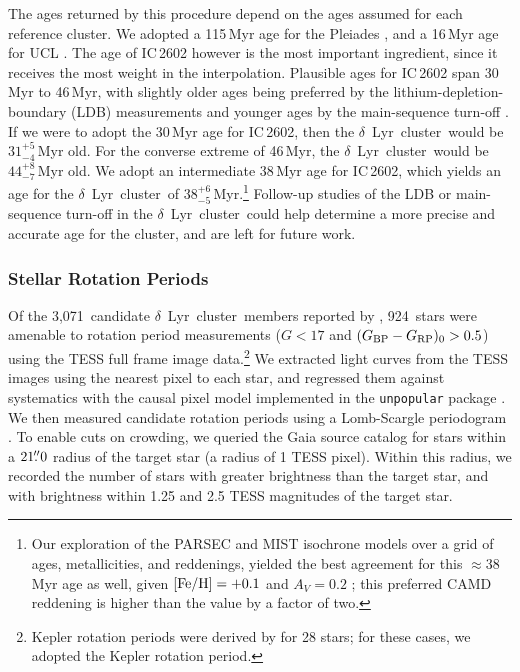 \documentclass[12pt,modern,twocolumn,tighten]{aastex63}
\newcommand{\cn}{$\delta$\ Lyr\ cluster} %
\newcommand{\clusterage}{$38^{+6}_{-5}$\,Myr} %
\newcommand{\noriginal}{3{,}071} %
\newcommand{\nwithtess}{924} %
\newcommand{\bpmrpo}{(G_{\rm BP}-G_{\rm RP})_0}
\begin{document}

The ages returned by this procedure depend on the ages assumed for
each reference cluster.  We adopted a 115\,Myr age for the Pleiades \citep{dahm_2015},
and a 16\,Myr age for UCL \citep{pecaut_star_2016}.  The age
of IC\,2602 however is the most important ingredient, since it
receives the most weight in the interpolation.  Plausible ages for
IC\,2602 span 30\,Myr to 46\,Myr, with slightly older ages being
preferred by the lithium-depletion-boundary (LDB) measurements 
\citep{dobbie_ic_2010,randich_gaiaeso_2018}
and
younger ages by the main-sequence turn-off
\citep{stauffer_rotational_1997,david_ages_2015,bossini_age_2019}.
If we were to adopt the 30\,Myr age for IC\,2602, then the \cn\ would
be $31^{+5}_{-4}$\,Myr old.  For the converse extreme of 46\,Myr, the
\cn\ would be $44^{+8}_{-7}$\,Myr old.  We adopt an intermediate
38\,Myr age for IC\,2602, which yields an age for the \cn\ of
\clusterage.\footnote{Our exploration of the PARSEC and MIST isochrone
models over a grid of ages, metallicities, and reddenings, yielded the
best agreement for this $\approx 38\,$Myr age as well, given ${\rm
[Fe/H] = +0.1}$ and $A_V=0.2$
\citep{bressan_parsec_2012,choi_mesa_2016};  this preferred CAMD
reddening is higher than the \citet{lallement_threedimensional_2018}
value by a factor of two.  } Follow-up studies of the LDB or
main-sequence turn-off in the \cn\ could help determine a more precise
and accurate age for the cluster, and are left for future work.





\subsubsection{Stellar Rotation Periods}

Of the \noriginal\ candidate \cn\ members reported by
\citet{kounkel_untangling_2019}, \nwithtess\ stars were amenable to
rotation period measurements ($G<17$ and $\bpmrpo>0.5$) using the TESS
full frame image data.\footnote{Kepler rotation periods were derived
by \citet{mcquillan_rotation_2014} for 28 stars; for these cases, we
adopted the Kepler rotation period.  } We extracted light curves from
the TESS images using the nearest pixel to each star, and regressed
them against systematics with the causal pixel model implemented in
the \texttt{unpopular} package \citep{hattorio_2021_cpm}.  We then
measured candidate rotation periods using a Lomb-Scargle periodogram
\citep{lomb_1976,scargle_studies_1982,astropy_2018}.  To enable cuts
on crowding, we queried the Gaia source catalog for stars within a
$21\mbox{$.\!\!^{\prime\prime}$}0$ radius of the target star (a radius of 1 TESS pixel).
Within this radius, we recorded the number of stars with greater
brightness than the target star, and with brightness within 1.25 and
2.5 TESS magnitudes of the target star.  
\end{document}

